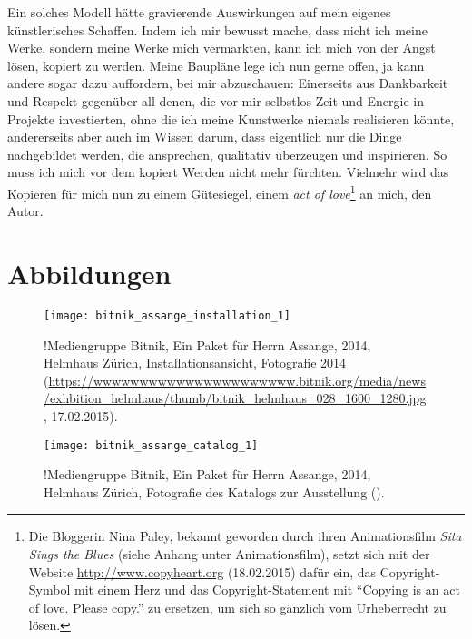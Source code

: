 \documentclass[
paper=164mm:234mm, %
pagesize, %
DIV=calc, %
10pt, %
BCOR=0mm, %
parskip=half- %
]{scrbook}
\begin{document}
Ein solches Modell hätte gravierende Auswirkungen auf mein eigenes künstlerisches Schaffen. Indem ich mir bewusst mache, dass nicht ich meine Werke, sondern meine Werke mich vermarkten, kann ich mich von der Angst lösen, kopiert zu werden. Meine Baupläne lege ich nun gerne offen, ja kann andere sogar dazu auffordern, bei mir abzuschauen: Einerseits aus Dankbarkeit und Respekt gegenüber all denen, die vor mir selbstlos Zeit und Energie in Projekte investierten, ohne die ich meine Kunstwerke niemals realisieren könnte, andererseits aber auch im Wissen darum, dass eigentlich nur die Dinge nachgebildet werden, die ansprechen, qualitativ überzeugen und inspirieren. So muss ich mich vor dem kopiert Werden nicht mehr fürchten. Vielmehr wird das Kopieren für mich nun zu einem Gütesiegel, einem \emph{act of love}\footnote{Die Bloggerin Nina Paley, bekannt geworden durch ihren Animationsfilm \emph{Sita Sings the Blues} (siehe Anhang unter Animationsfilm), setzt sich mit der Website \url{http://www.copyheart.org} (18.02.2015) dafür ein, das Copyright-Symbol mit einem Herz und das Copyright-Statement mit \enquote{Copying is an act of love. Please copy.} zu ersetzen, um sich so gänzlich vom Urheberrecht zu lösen.} an mich, den Autor.


{}
\printbibliography

{}
\chapter*{Abbildungen}
\newpage

\begin{figure}[H]
	\centering
	\texttt{[image: bitnik\_assange\_installation\_1]}
	\caption{!Mediengruppe Bitnik, Ein Paket für Herrn Assange, 2014, Helmhaus Zürich, Installationsansicht, Fotografie 2014 (\url{https://wwwwwwwwwwwwwwwwwwwwww.bitnik.org/media/news/exhbition_helmhaus/thumb/bitnik_helmhaus_028_1600_1280.jpg}, 17.02.2015).}
	\label{fig:bitnik_assange_installation_1}
\end{figure}

\begin{figure}[H]
	\centering
	\texttt{[image: bitnik\_assange\_catalog\_1]}
	\caption{!Mediengruppe Bitnik, Ein Paket für Herrn Assange, 2014, Helmhaus Zürich, Fotografie des Katalogs zur Ausstellung (\cite[14-15]{Ryser/MediengruppeBitnik:2014}).}
	\label{fig:bitnik_assange_catalog_1}
\end{figure}
\end{document}
